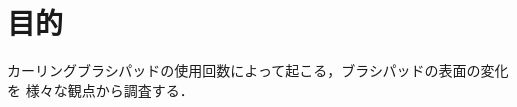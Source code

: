\documentclass[main]{subfiles}
\begin{document}
\chapter{目的}
カーリングブラシパッドの使用回数によって起こる，ブラシパッドの表面の変化を
様々な観点から調査する．
\end{document}
